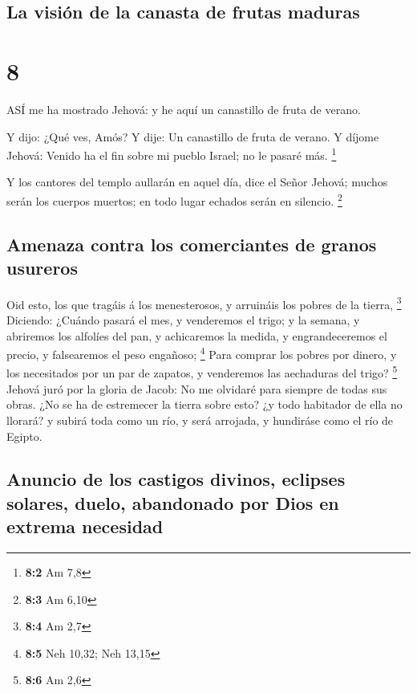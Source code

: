 \hypertarget{la-visiuxf3n-de-la-canasta-de-frutas-maduras}{%
\subsection{La visión de la canasta de frutas
maduras}\label{la-visiuxf3n-de-la-canasta-de-frutas-maduras}}

\hypertarget{section-7}{%
\section{8}\label{section-7}}

 ASÍ me ha mostrado Jehová: y he aquí un canastillo de fruta
de verano.

 Y dijo: ¿Qué ves, Amós? Y dije: Un canastillo de fruta de
verano. Y díjome Jehová: Venido ha el fin sobre mi pueblo Israel; no le
pasaré más. \footnote{\textbf{8:2} Am 7,8}

 Y los cantores del templo aullarán en aquel día, dice el
Señor Jehová; muchos serán los cuerpos muertos; en todo lugar echados
serán en silencio. \footnote{\textbf{8:3} Am 6,10}

\hypertarget{amenaza-contra-los-comerciantes-de-granos-usureros}{%
\subsection{Amenaza contra los comerciantes de granos
usureros}\label{amenaza-contra-los-comerciantes-de-granos-usureros}}

 Oid esto, los que tragáis á los menesterosos, y arruináis
los pobres de la tierra, \footnote{\textbf{8:4} Am 2,7} 
Diciendo: ¿Cuándo pasará el mes, y venderemos el trigo; y la semana, y
abriremos los alfolíes del pan, y achicaremos la medida, y
engrandeceremos el precio, y falsearemos el peso engañoso; \footnote{\textbf{8:5}
  Neh 10,32; Neh 13,15}  Para comprar los pobres por dinero,
y los necesitados por un par de zapatos, y venderemos las aechaduras del
trigo? \footnote{\textbf{8:6} Am 2,6}  Jehová juró por la
gloria de Jacob: No me olvidaré para siempre de todas sus obras.
 ¿No se ha de estremecer la tierra sobre esto? ¿y todo
habitador de ella no llorará? y subirá toda como un río, y será
arrojada, y hundiráse como el río de Egipto.

\hypertarget{anuncio-de-los-castigos-divinos-eclipses-solares-duelo-abandonado-por-dios-en-extrema-necesidad}{%
\subsection{Anuncio de los castigos divinos, eclipses solares, duelo,
abandonado por Dios en extrema
necesidad}\label{anuncio-de-los-castigos-divinos-eclipses-solares-duelo-abandonado-por-dios-en-extrema-necesidad}}

